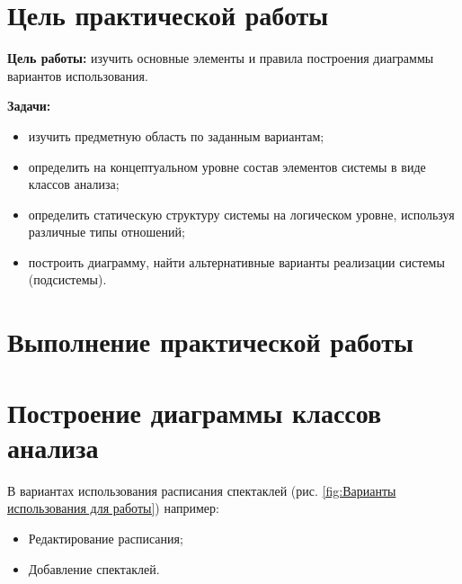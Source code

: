 \graphicspath{{./SecondTask/}} %

\section*{\LARGE Цель практической работы}

\textbf{Цель работы:} изучить основные элементы и правила построения диаграммы
вариантов использования.

\textbf{Задачи:}\par
\begin{itemize}
	\item изучить предметную область по заданным вариантам;
	\item определить на концептуальном уровне состав элементов системы в
	виде классов анализа;
	\item определить статическую структуру системы на логическом уровне,
	используя различные типы отношений;
	\item построить диаграмму, найти альтернативные варианты реализации
	системы (подсистемы).
\end{itemize}

\newpage

\section*{\LARGE Выполнение практической работы}
\section{Построение диаграммы классов анализа}
В вариантах использования расписания спектаклей (рис. \ref{fig:Варианты использования для работы}) например:
\begin{itemize}
	\item Редактирование расписания;
	\item Добавление спектаклей.
\end{itemize}


